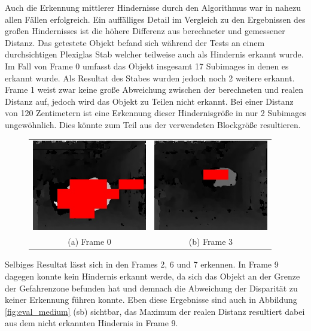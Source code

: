 \noindent
Auch die Erkennung mittlerer Hindernisse durch den Algorithmus war in nahezu allen Fällen erfolgreich. Ein auffälliges Detail im Vergleich zu den Ergebnissen des großen Hindernisses ist die höhere Differenz aus berechneter und gemessener Distanz. Das getestete Objekt befand sich während der Tests an einem durchsichtigen Plexiglas Stab welcher teilweise auch als Hindernis erkannt wurde. Im Fall von Frame 0 umfasst das Objekt insgesamt 17 Subimages in denen es erkannt wurde. Als Resultat des Stabes wurden jedoch noch 2 weitere erkannt. Frame 1 weist zwar keine große Abweichung zwischen der berechneten und realen Distanz auf, jedoch wird das Objekt zu Teilen nicht erkannt. Bei einer Distanz von 120 Zentimetern ist eine Erkennung dieser Hindernisgröße in nur 2 Subimages ungewöhnlich. Dies könnte zum Teil aus der verwendeten Blockgröße resultieren.

\begin{figure}[h]
	\centering
	\begin{tabular}{cc}
	\includegraphics[width=5cm]{img/evaluation/medium_test_0_disparity}&
	\includegraphics[width=5cm]{img/evaluation/medium_test_1_disparity}\\
	(a) Frame 0 &  (b) Frame 3
	\end{tabular}
	\caption{}
	\label{fig:eval_medium_fails}
\end{figure}

\noindent
Selbiges Resultat lässt sich in den Frames 2, 6 und 7 erkennen. In Frame 9 dagegen konnte kein Hindernis erkannt werde, da sich das Objekt an der Grenze der Gefahrenzone befunden hat und demnach die Abweichung der Disparität zu keiner Erkennung führen konnte. Eben diese Ergebnisse sind auch in Abbildung \ref{fig:eval_medium} (sb) sichtbar, das Maximum der realen Distanz resultiert dabei aus dem nicht erkannten Hindernis in Frame 9.\\

